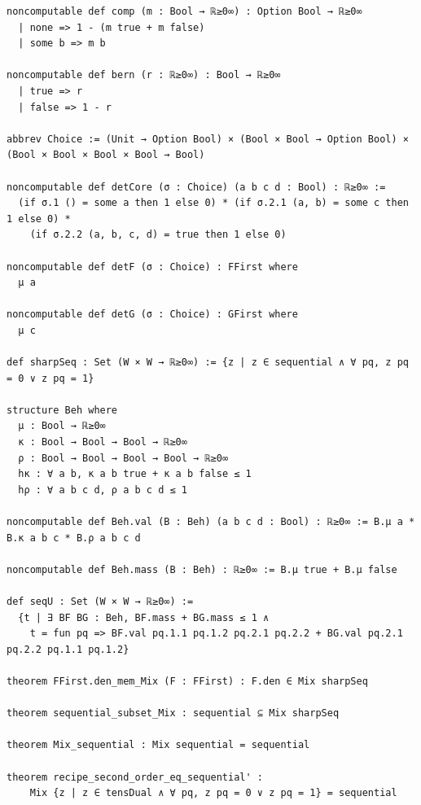 \label{lean:kuhn-bool}
\begin{lstlisting}
noncomputable def comp (m : Bool → ℝ≥0∞) : Option Bool → ℝ≥0∞
  | none => 1 - (m true + m false)
  | some b => m b

noncomputable def bern (r : ℝ≥0∞) : Bool → ℝ≥0∞
  | true => r
  | false => 1 - r

abbrev Choice := (Unit → Option Bool) × (Bool × Bool → Option Bool) × (Bool × Bool × Bool × Bool → Bool)

noncomputable def detCore (σ : Choice) (a b c d : Bool) : ℝ≥0∞ :=
  (if σ.1 () = some a then 1 else 0) * (if σ.2.1 (a, b) = some c then 1 else 0) *
    (if σ.2.2 (a, b, c, d) = true then 1 else 0)

noncomputable def detF (σ : Choice) : FFirst where
  μ a

noncomputable def detG (σ : Choice) : GFirst where
  μ c

def sharpSeq : Set (W × W → ℝ≥0∞) := {z | z ∈ sequential ∧ ∀ pq, z pq = 0 ∨ z pq = 1}

structure Beh where
  μ : Bool → ℝ≥0∞
  κ : Bool → Bool → Bool → ℝ≥0∞
  ρ : Bool → Bool → Bool → Bool → ℝ≥0∞
  hκ : ∀ a b, κ a b true + κ a b false ≤ 1
  hρ : ∀ a b c d, ρ a b c d ≤ 1

noncomputable def Beh.val (B : Beh) (a b c d : Bool) : ℝ≥0∞ := B.μ a * B.κ a b c * B.ρ a b c d

noncomputable def Beh.mass (B : Beh) : ℝ≥0∞ := B.μ true + B.μ false

def seqU : Set (W × W → ℝ≥0∞) :=
  {t | ∃ BF BG : Beh, BF.mass + BG.mass ≤ 1 ∧
    t = fun pq => BF.val pq.1.1 pq.1.2 pq.2.1 pq.2.2 + BG.val pq.2.1 pq.2.2 pq.1.1 pq.1.2}

theorem FFirst.den_mem_Mix (F : FFirst) : F.den ∈ Mix sharpSeq

theorem sequential_subset_Mix : sequential ⊆ Mix sharpSeq

theorem Mix_sequential : Mix sequential = sequential

theorem recipe_second_order_eq_sequential' :
    Mix {z | z ∈ tensDual ∧ ∀ pq, z pq = 0 ∨ z pq = 1} = sequential
\end{lstlisting}

